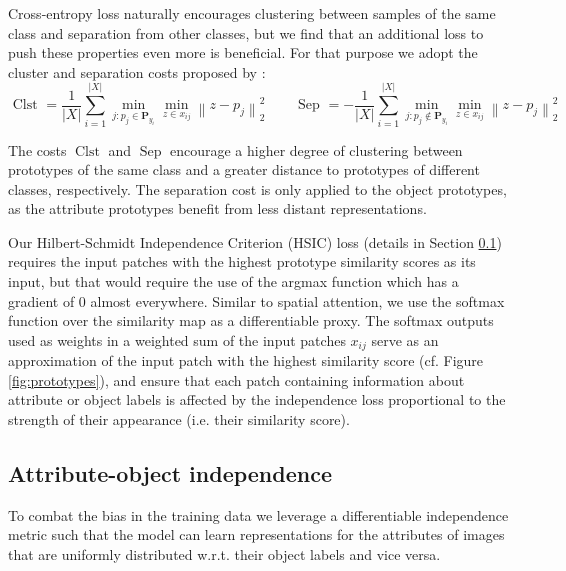 \documentclass{article}
\begin{document}
Cross-entropy loss naturally encourages clustering between samples of the same class and separation from other classes, but we find that an additional loss to push these properties even more is beneficial. For that purpose we adopt the cluster and separation costs proposed by \citet{chen2019looks}:
\begin{equation}
\text { Clst }=\frac{1}{|X|} \sum_{i=1}^{|X|} \min_{j: p_{j} \in \mathbf{P}_{y_{i}}} \min_{ z \in x_{ij}}\left\|z-p_{j}\right\|_{2}^{2} \qquad \text { Sep }=-\frac{1}{|X|} \sum_{i=1}^{|X|} \min_{j: p_{j} \notin \mathbf{P}_{y_{i}}} \min_{z \in x_{ij}}\left\|z-p_{j}\right\|_{2}^{2}
\end{equation}

The costs $\operatorname{Clst}$ and $\operatorname{Sep}$ encourage a higher degree of clustering between prototypes of the same class and a greater distance to prototypes of different classes, respectively. The separation cost is only applied to the object prototypes, as the attribute prototypes benefit from less distant representations.

Our Hilbert-Schmidt Independence Criterion (HSIC) loss (details in Section \ref{sec:hsic_method}) requires the input patches with the highest prototype similarity scores as its input, but that would require the use of the argmax function which has a gradient of 0 almost everywhere. Similar to spatial attention, we use the softmax function over the similarity map as a differentiable proxy. The softmax outputs used as weights in a weighted sum of the input patches $x_{ij}$ serve as an approximation of the input patch with the highest similarity score (cf. Figure \ref{fig:prototypes}), and ensure that each patch containing information about attribute or object labels is affected by the independence loss proportional to the strength of their appearance (i.e. their similarity score).

\subsection{Attribute-object independence}
\label{sec:hsic_method}
To combat the bias in the training data we leverage a differentiable independence metric such that the model can learn representations for the attributes of images that are uniformly distributed w.r.t. their object labels and vice versa.
\end{document}
